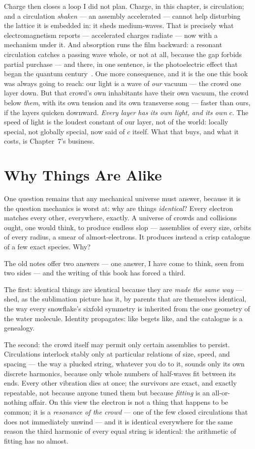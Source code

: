 \documentclass[fontsize=11pt,paper=a4,pagesize=auto,parskip=half-]{scrbook}
\begin{document}
Charge then closes a loop I did not plan. Charge, in this chapter, is circulation; and a circulation \emph{shaken} --- an assembly accelerated --- cannot help disturbing the lattice it is embedded in: it sheds medium-waves. That is precisely what electromagnetism reports --- accelerated charges radiate --- now with a mechanism under it. And absorption runs the film backward: a resonant circulation catches a passing wave whole, or not at all, because the gap forbids partial purchase --- and there, in one sentence, is the photoelectric effect that began the quantum century~\cite{einstein1905photo}. One more consequence, and it is the one this book was always going to reach: our light is a wave of \emph{our} vacuum --- the crowd one layer down. But that crowd's own inhabitants have their own vacuum, the crowd below \emph{them}, with its own tension and its own transverse song --- faster than ours, if the layers quicken downward. \emph{Every layer has its own light, and its own} $c$. The speed of light is the loudest constant of our layer, not of the world: locally special, not globally special, now said of $c$ itself. What that buys, and what it costs, is Chapter~7's business.

\section{Why Things Are Alike}

One question remains that any mechanical universe must answer, because it is the question mechanics is worst at: why are things \emph{identical}? Every electron matches every other, everywhere, exactly. A universe of crowds and collisions ought, one would think, to produce endless slop --- assemblies of every size, orbits of every radius, a smear of almost-electrons. It produces instead a crisp catalogue of a few exact species. Why?

The old notes offer two answers --- one answer, I have come to think, seen from two sides --- and the writing of this book has forced a third.

The first: identical things are identical because they are \emph{made the same way} --- shed, as the sublimation picture has it, by parents that are themselves identical, the way every snowflake's sixfold symmetry is inherited from the one geometry of the water molecule. Identity propagates: like begets like, and the catalogue is a genealogy.

The second: the crowd itself may permit only certain assemblies to persist. Circulations interlock stably only at particular relations of size, speed, and spacing --- the way a plucked string, whatever you do to it, sounds only its own discrete harmonics, because only whole numbers of half-waves fit between its ends. Every other vibration dies at once; the survivors are exact, and exactly repeatable, not because anyone tuned them but because \emph{fitting} is an all-or-nothing affair. On this view the electron is not a thing that happens to be common; it is a \emph{resonance of the crowd} --- one of the few closed circulations that does not immediately unwind --- and it is identical everywhere for the same reason the third harmonic of every equal string is identical: the arithmetic of fitting has no almost.
\end{document}
